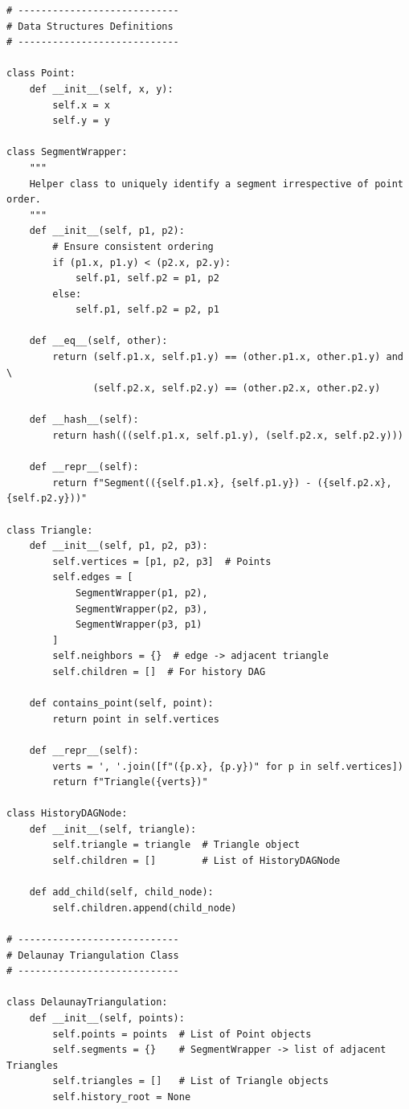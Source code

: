 \documentclass{article}
\begin{document}
\begin{verbatim}
# ----------------------------
# Data Structures Definitions
# ----------------------------

class Point:
    def __init__(self, x, y):
        self.x = x
        self.y = y

class SegmentWrapper:
    """
    Helper class to uniquely identify a segment irrespective of point order.
    """
    def __init__(self, p1, p2):
        # Ensure consistent ordering
        if (p1.x, p1.y) < (p2.x, p2.y):
            self.p1, self.p2 = p1, p2
        else:
            self.p1, self.p2 = p2, p1

    def __eq__(self, other):
        return (self.p1.x, self.p1.y) == (other.p1.x, other.p1.y) and \
               (self.p2.x, self.p2.y) == (other.p2.x, other.p2.y)

    def __hash__(self):
        return hash(((self.p1.x, self.p1.y), (self.p2.x, self.p2.y)))

    def __repr__(self):
        return f"Segment(({self.p1.x}, {self.p1.y}) - ({self.p2.x}, {self.p2.y}))"

class Triangle:
    def __init__(self, p1, p2, p3):
        self.vertices = [p1, p2, p3]  # Points
        self.edges = [
            SegmentWrapper(p1, p2),
            SegmentWrapper(p2, p3),
            SegmentWrapper(p3, p1)
        ]
        self.neighbors = {}  # edge -> adjacent triangle
        self.children = []  # For history DAG

    def contains_point(self, point):
        return point in self.vertices

    def __repr__(self):
        verts = ', '.join([f"({p.x}, {p.y})" for p in self.vertices])
        return f"Triangle({verts})"

class HistoryDAGNode:
    def __init__(self, triangle):
        self.triangle = triangle  # Triangle object
        self.children = []        # List of HistoryDAGNode

    def add_child(self, child_node):
        self.children.append(child_node)

# ----------------------------
# Delaunay Triangulation Class
# ----------------------------

class DelaunayTriangulation:
    def __init__(self, points):
        self.points = points  # List of Point objects
        self.segments = {}    # SegmentWrapper -> list of adjacent Triangles
        self.triangles = []   # List of Triangle objects
        self.history_root = None


\end{verbatim}
\end{document}
